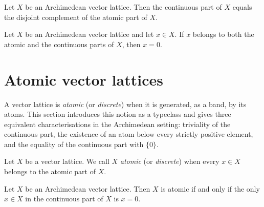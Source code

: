 \begin{lemma}
\label{lem:continuousPart-eq-disjointComplement-atomicPart}
\leanok
{}
Let $X$ be an Archimedean vector lattice. Then the continuous part
of $X$ equals the disjoint complement of the atomic part of $X$.
\end{lemma}

\begin{theorem}
\label{thm:atomicPart-inter-continuousPart-eq-zero}
\leanok
{}
Let $X$ be an Archimedean vector lattice and let $x \in X$. If $x$
belongs to both the atomic and the continuous parts of $X$, then
$x = 0$.
\end{theorem}

\section{Atomic vector lattices}

A vector lattice is \emph{atomic} (or \emph{discrete}) when it is
generated, as a band, by its atoms. This section introduces this
notion as a typeclass and gives three equivalent characterisations
in the Archimedean setting: triviality of the continuous part, the
existence of an atom below every strictly positive element, and the
equality of the continuous part with $\{0\}$.

\begin{definition}
\label{def:isAtomicVectorLattice}
\leanok
{}
Let $X$ be a vector lattice. We call $X$ \emph{atomic} (or
\emph{discrete}) when every $x \in X$ belongs to the atomic part of
$X$.
\end{definition}

\begin{theorem}
\label{thm:isAtomicVectorLattice-iff-continuousPart-eq-zero}
\leanok
{}
Let $X$ be an Archimedean vector lattice. Then $X$ is atomic if and
only if the only $x \in X$ in the continuous part of $X$ is $x = 0$.
\end{theorem}

